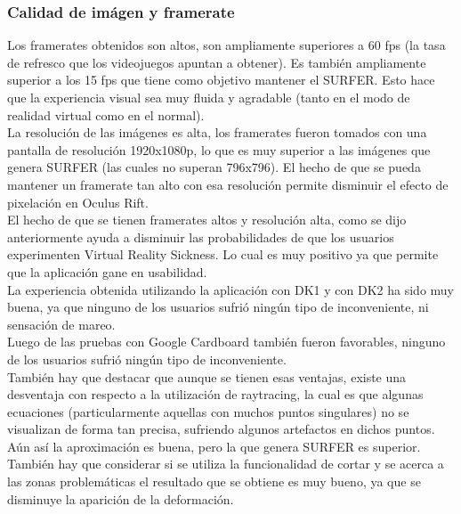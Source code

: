 \documentclass[12pt]{article}
\begin{document}
\subsubsection{Calidad de imágen y framerate}
Los framerates obtenidos son altos, son ampliamente superiores a 60 fps (la tasa de refresco que los videojuegos apuntan a obtener). Es también ampliamente superior a los 15 fps que tiene como objetivo mantener el SURFER. Esto hace que la experiencia visual sea muy fluida y agradable (tanto en el modo de realidad virtual como en el normal). 
\\La resolución de las imágenes es alta, los framerates fueron tomados con una pantalla de resolución 1920x1080p, lo que es muy superior a las imágenes que genera SURFER (las cuales no superan 796x796). El hecho de que se pueda mantener un framerate tan alto con esa resolución permite disminuir el efecto de pixelación en Oculus Rift. 
\\El hecho de que se tienen framerates altos y resolución alta, como se dijo anteriormente ayuda a disminuir las probabilidades de que los usuarios experimenten Virtual Reality Sickness. Lo cual es muy positivo ya que permite que la aplicación gane en usabilidad.
\\La experiencia obtenida utilizando la aplicación con DK1 y con DK2 ha sido muy buena, ya que ninguno de los usuarios sufrió ningún tipo de inconveniente, ni sensación de mareo. 
\\Luego de las pruebas con Google Cardboard también fueron favorables, ninguno de los usuarios sufrió ningún tipo de inconveniente.
\\También hay que destacar que aunque se tienen esas ventajas, existe una desventaja con respecto a la utilización de raytracing, la cual es que algunas ecuaciones (particularmente aquellas con muchos puntos singulares) no se visualizan de forma tan precisa, sufriendo algunos artefactos en dichos puntos. Aún así la aproximación es buena, pero la que genera SURFER es superior. También hay que considerar si se utiliza la funcionalidad de cortar y se acerca a las zonas problemáticas el resultado que se obtiene es muy bueno, ya que se disminuye la aparición de la deformación.
\end{document}
